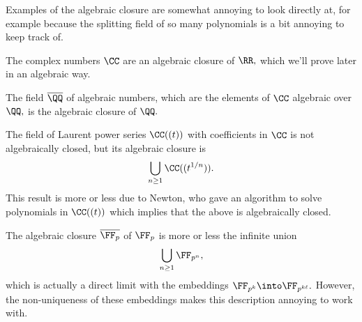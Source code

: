 

Examples of the algebraic closure are somewhat annoying to look directly at, for example because the splitting field of so many polynomials is a bit annoying to keep track of.
\begin{example}
	The complex numbers $\CC$ are an algebraic closure of $\RR,$ which we'll prove later in an algebraic way.
\end{example}
\begin{example}
	The field $\overline\QQ$ of algebraic numbers, which are the elements of $\CC$ algebraic over $\QQ,$ is the algebraic closure of $\QQ.$
\end{example}
\begin{example}
	The field of Laurent power series $\CC((t))$ with coefficients in $\CC$ is not algebraically closed, but its algebraic closure is
	\[\bigcup_{n\ge1}\CC((t^{1/n})).\]
	This result is more or less due to Newton, who gave an algorithm to solve polynomials in $\CC((t))$ which implies that the above is algebraically closed.
\end{example}
\begin{example}
	The algebraic closure $\overline{\FF_p}$ of $\FF_p$ is more or less the infinite union
	\[\bigcup_{n\ge1}\FF_{p^n},\]
	which is actually a direct limit with the embeddings $\FF_{p^k}\into\FF_{p^{k\ell}}.$ However, the non-uniqueness of these embeddings makes this description annoying to work with.
\end{example}

